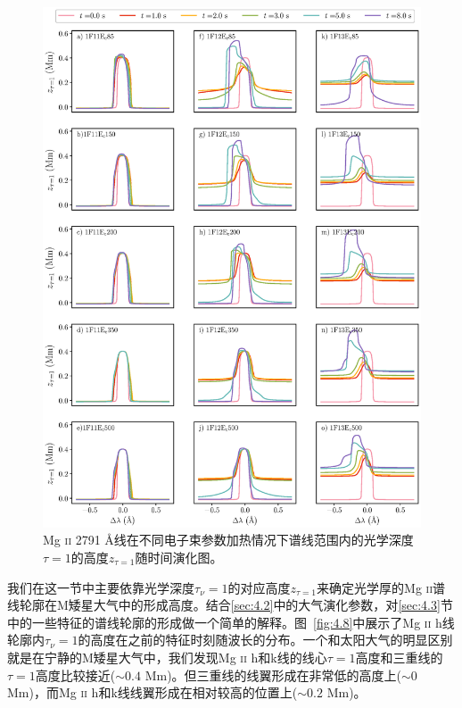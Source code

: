 \begin{figure}
	\centering
	\includegraphics[width=\textwidth]{figs/dMe_MgII2791_tau1}
	\caption{Mg \textsc{ii} 2791 \mbox{\AA}线在不同电子束参数加热情况下谱线范围内的光学深度$\tau = 1$的高度$z_{\tau=1}$随时间演化图。}
	\label{fig:4.9}
\end{figure}

我们在这一节中主要依靠光学深度$\tau_\nu = 1$的对应高度$z_{\tau = 1}$来确定光学厚的Mg \textsc{ii}谱线轮廓在M矮星大气中的形成高度。结合\ref{sec:4.2}中的大气演化参数，对\ref{sec:4.3}节中的一些特征的谱线轮廓的形成做一个简单的解释。图~\ref{fig:4.8}中展示了Mg \textsc{ii} h线轮廓内$\tau_\nu = 1$的高度在之前的特征时刻随波长的分布。一个和太阳大气的明显区别就是在宁静的M矮星大气中，我们发现Mg \textsc{ii} h和k线的线心$\tau = 1$高度和三重线的$\tau = 1$高度比较接近($\sim 0.4 $ Mm)。但三重线的线翼形成在非常低的高度上($\sim 0$ Mm)，而Mg \textsc{ii} h和k线线翼形成在相对较高的位置上($\sim 0.2$ Mm)。

